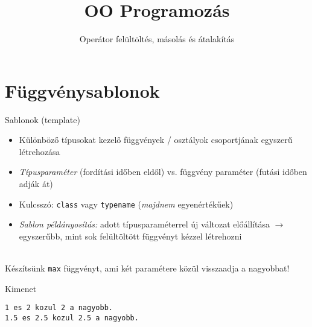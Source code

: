 \documentclass[usenames,dvipsnames,aspectratio=169]{beamer}
\title[OO Programozás - C++]{OO Programozás}
\subtitle{Operátor felültöltés, másolás és átalakítás}
\begin{document}
\begin{frame}[plain]
  \titlepage
  \logoalul
\end{frame}

\section{Függvénysablonok}

\begin{frame}
    Sablonok (template)
    \begin{itemize}
        \item Különböző típusokat kezelő függvények / osztályok csoportjának egyszerű létrehozása
        \item \emph{Típusparaméter} (fordítási időben eldől) vs. függvény paraméter (futási időben adják át)
        \item Kulcsszó: \texttt{class} vagy \texttt{typename} (\emph{majdnem} egyenértékűek)
        \item \emph{Sablon példányosítás:} adott típusparaméterrel új változat előállítása $\to$ egyszerűbb, mint sok felültöltött függvényt kézzel létrehozni
    \end{itemize}
    \vfill
    \begin{description}[m]
        \item[Feladat:] \hfill \\ Készítsünk \texttt{max} függvényt, ami két paramétere közül visszaadja a nagyobbat!
    \end{description}
\end{frame}

\begin{frame}
    \begin{exampleblock}{}
        
    \end{exampleblock}
\end{frame}

\begin{frame}[fragile]
    \begin{exampleblock}{}
        \vspace{-.2cm}
        \scriptsize
        
        \vspace{-.2cm}
    \end{exampleblock}
    \begin{block}{Kimenet}
        \vspace{-.4cm}
        \scriptsize
        \begin{verbatim}
1 es 2 kozul 2 a nagyobb.
1.5 es 2.5 kozul 2.5 a nagyobb.
\end{verbatim}             
        \vspace{-.4cm}
    \end{block}
\end{frame}
\end{document}
